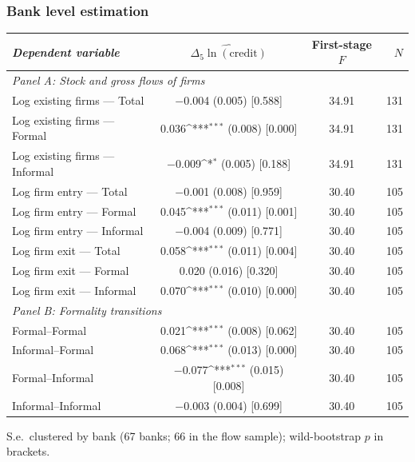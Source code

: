 \documentclass[aspectratio=169]{beamer}
\newcommand{\sym}[1]{\ifmmode^{#1}\else\(^{#1}\)\fi}
\begin{document}
\begin{frame}[noframenumbering]
\frametitle{\textbf{Bank level estimation}} \label{banklevel}
\begin{center}
    \scriptsize
    \begin{tabular}{lccr}
        \toprule
        \textit{Dependent variable} & $\widehat{\Delta_5\ln(\text{credit})}$ & First-stage $F$ & $N$ \\
        \midrule
        \multicolumn{4}{l}{\textit{Panel A: Stock and gross flows of firms}} \\
        Log existing firms --- Total     & $-$0.004                    (0.005) [0.588] & 34.91 & 131 \\
        Log existing firms --- Formal    & \phantom{$-$}0.036\sym{***} (0.008) [0.000] & 34.91 & 131 \\
        Log existing firms --- Informal  & $-$0.009\sym{*}             (0.005) [0.188] & 34.91 & 131 \\
        Log firm entry --- Total         & $-$0.001                    (0.008) [0.959] & 30.40 & 105 \\
        Log firm entry --- Formal        & \phantom{$-$}0.045\sym{***} (0.011) [0.001] & 30.40 & 105 \\
        Log firm entry --- Informal      & $-$0.004                    (0.009) [0.771] & 30.40 & 105 \\
        Log firm exit --- Total          & \phantom{$-$}0.058\sym{***} (0.011) [0.004] & 30.40 & 105 \\
        Log firm exit --- Formal         & \phantom{$-$}0.020          (0.016) [0.320] & 30.40 & 105 \\
        Log firm exit --- Informal       & \phantom{$-$}0.070\sym{***} (0.010) [0.000] & 30.40 & 105 \\
        \midrule
        \multicolumn{4}{l}{\textit{Panel B: Formality transitions}} \\
        Formal--Formal                   & \phantom{$-$}0.021\sym{***} (0.008) [0.062] & 30.40 & 105 \\
        Informal--Formal                 & \phantom{$-$}0.068\sym{***} (0.013) [0.000] & 30.40 & 105 \\
        Formal--Informal                 & $-$0.077\sym{***}           (0.015) [0.008] & 30.40 & 105 \\
        Informal--Informal               & $-$0.003                    (0.004) [0.699] & 30.40 & 105 \\
        \bottomrule
    \end{tabular}
\end{center}
{\tiny S.e.\ clustered by bank (67 banks; 66 in the flow sample); wild-bootstrap $p$ in brackets.}\\
\hyperlink{robustness}{}
\end{frame}
\end{document}
